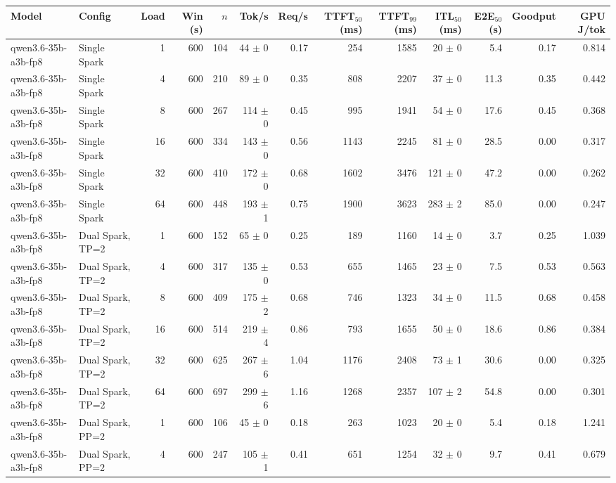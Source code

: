 \begin{tabular}{l l r r r r r r r r r r r}
\toprule
Model & Config & Load & Win (s) & $n$ & Tok/s & Req/s & TTFT$_{50}$ (ms) & TTFT$_{99}$ (ms) & ITL$_{50}$ (ms) & E2E$_{50}$ (s) & Goodput & GPU J/tok \\
\midrule
qwen3.6-35b-a3b-fp8 & Single Spark & 1 & 600 & 104 & 44 $\pm$ 0 & 0.17 & 254 & 1585 & 20 $\pm$ 0 & 5.4 & 0.17 & 0.814 \\
qwen3.6-35b-a3b-fp8 & Single Spark & 4 & 600 & 210 & 89 $\pm$ 0 & 0.35 & 808 & 2207 & 37 $\pm$ 0 & 11.3 & 0.35 & 0.442 \\
qwen3.6-35b-a3b-fp8 & Single Spark & 8 & 600 & 267 & 114 $\pm$ 0 & 0.45 & 995 & 1941 & 54 $\pm$ 0 & 17.6 & 0.45 & 0.368 \\
qwen3.6-35b-a3b-fp8 & Single Spark & 16 & 600 & 334 & 143 $\pm$ 0 & 0.56 & 1143 & 2245 & 81 $\pm$ 0 & 28.5 & 0.00 & 0.317 \\
qwen3.6-35b-a3b-fp8 & Single Spark & 32 & 600 & 410 & 172 $\pm$ 0 & 0.68 & 1602 & 3476 & 121 $\pm$ 0 & 47.2 & 0.00 & 0.262 \\
qwen3.6-35b-a3b-fp8 & Single Spark & 64 & 600 & 448 & 193 $\pm$ 1 & 0.75 & 1900 & 3623 & 283 $\pm$ 2 & 85.0 & 0.00 & 0.247 \\
\addlinespace
qwen3.6-35b-a3b-fp8 & Dual Spark, TP=2 & 1 & 600 & 152 & 65 $\pm$ 0 & 0.25 & 189 & 1160 & 14 $\pm$ 0 & 3.7 & 0.25 & 1.039 \\
qwen3.6-35b-a3b-fp8 & Dual Spark, TP=2 & 4 & 600 & 317 & 135 $\pm$ 0 & 0.53 & 655 & 1465 & 23 $\pm$ 0 & 7.5 & 0.53 & 0.563 \\
qwen3.6-35b-a3b-fp8 & Dual Spark, TP=2 & 8 & 600 & 409 & 175 $\pm$ 2 & 0.68 & 746 & 1323 & 34 $\pm$ 0 & 11.5 & 0.68 & 0.458 \\
qwen3.6-35b-a3b-fp8 & Dual Spark, TP=2 & 16 & 600 & 514 & 219 $\pm$ 4 & 0.86 & 793 & 1655 & 50 $\pm$ 0 & 18.6 & 0.86 & 0.384 \\
qwen3.6-35b-a3b-fp8 & Dual Spark, TP=2 & 32 & 600 & 625 & 267 $\pm$ 6 & 1.04 & 1176 & 2408 & 73 $\pm$ 1 & 30.6 & 0.00 & 0.325 \\
qwen3.6-35b-a3b-fp8 & Dual Spark, TP=2 & 64 & 600 & 697 & 299 $\pm$ 6 & 1.16 & 1268 & 2357 & 107 $\pm$ 2 & 54.8 & 0.00 & 0.301 \\
\addlinespace
qwen3.6-35b-a3b-fp8 & Dual Spark, PP=2 & 1 & 600 & 106 & 45 $\pm$ 0 & 0.18 & 263 & 1023 & 20 $\pm$ 0 & 5.4 & 0.18 & 1.241 \\
qwen3.6-35b-a3b-fp8 & Dual Spark, PP=2 & 4 & 600 & 247 & 105 $\pm$ 1 & 0.41 & 651 & 1254 & 32 $\pm$ 0 & 9.7 & 0.41 & 0.679 \\

\end{tabular}
